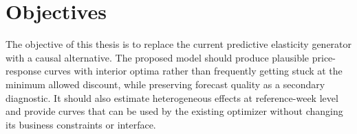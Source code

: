 \section{Objectives}
\label{sec:objectives}

The objective of this thesis is to replace the current predictive elasticity generator with a causal alternative. The proposed model should produce plausible price-response curves with interior optima rather than frequently getting stuck at the minimum allowed discount, while preserving forecast quality as a secondary diagnostic. It should also estimate heterogeneous effects at reference-week level and provide curves that can be used by the existing optimizer without changing its business constraints or interface.